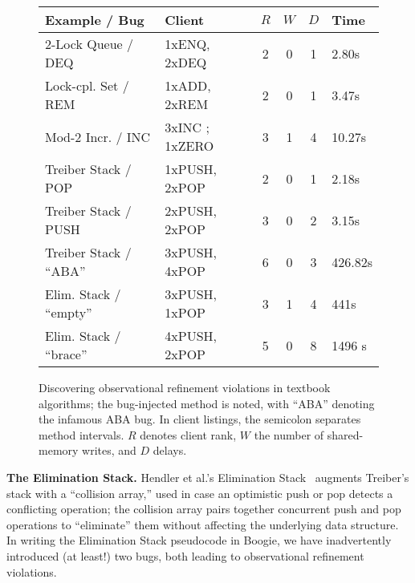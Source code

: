 \begin{figure}[t]
  \centering
  \scriptsize
  \begin{tabular}{|l|l|ccc|l|}
    \hline
    Example / Bug & Client & $R$ & $W$ & $D$ & Time \\
    \hline
    2-Lock Queue / DEQ 
    & 1xENQ, 2xDEQ
    & 2 & 0 & 1 & 2.80s \\
    Lock-cpl. Set / REM
    & 1xADD, 2xREM
    & 2 & 0 & 1 & 3.47s \\
    Mod-2 Incr. / INC
    & 3xINC ; 1xZERO
    & 3 & 1 & 4 & 10.27s \\
    Treiber Stack / POP 
    & 1xPUSH, 2xPOP
    & 2 & 0 & 1 & 2.18s \\
    Treiber Stack / PUSH
    & 2xPUSH, 2xPOP
    & 3 & 0 & 2 & 3.15s \\ %
    Treiber Stack / ``ABA''
    & 3xPUSH, 4xPOP
    & 6 & 0 & 3 & 426.82s \\
    \hline
    \hline
    Elim. Stack / ``empty''
    & 3xPUSH, 1xPOP
    & 3 & 1 & 4 & 441s \\
    Elim. Stack / ``brace''
    & 4xPUSH, 2xPOP
    & 5 & 0 & 8 & 1496 s \\
    \hline
  \end{tabular}
  \caption{Discovering observational refinement violations in textbook algorithms; 
    the bug-injected method is noted, with ``ABA'' denoting the
    infamous ABA bug.  In client listings, the semicolon separates method
    intervals. $R$ denotes client rank, $W$ the number of shared-memory writes,
    and $D$ delays.}
  \label{fig:exps:lin}
  \vspace{-3eX}
\end{figure}

\vspace{1mm}
\noindent
{\bf The Elimination Stack.}
Hendler et al.'s Elimination Stack~\cite{conf/spaa/HendlerSY04} augments
Treiber's stack with a ``collision array,'' used in case an optimistic push or
pop detects a conflicting operation; the collision array pairs together
concurrent push and pop operations to ``eliminate'' them without affecting the
underlying data structure. In writing the Elimination Stack pseudocode in
Boogie, we have inadvertently introduced (at least!) two bugs, both leading to
observational refinement violations.

